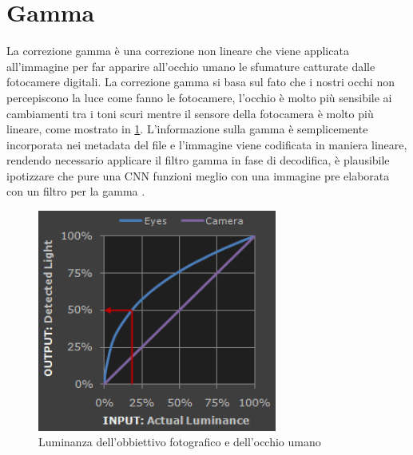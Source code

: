 \section{Gamma}\label{gamma}

La correzione gamma è una correzione non lineare che viene applicata all'immagine per far apparire all'occhio umano le sfumature catturate dalle fotocamere digitali. La correzione gamma si basa sul fato che i nostri occhi non percepiscono la luce come fanno le fotocamere, l'occhio è molto più sensibile ai cambiamenti tra i toni scuri mentre il sensore della fotocamera è molto più lineare, come mostrato in \cref{fig:gamma}. L'informazione sulla gamma è semplicemente incorporata nei metadata del file e l'immagine viene codificata in maniera lineare, rendendo necessario applicare il filtro gamma in fase di decodifica, è plausibile ipotizzare che pure una CNN funzioni meglio con una immagine pre elaborata con un filtro per la gamma \cite{gamma}.

\begin{figure}[ht]
    \centering
    \includegraphics[width=0.7\textwidth]{preprocessing/gamma.png}
    \caption{Luminanza dell'obbiettivo fotografico e dell'occhio umano}
    \label{fig:gamma}
\end{figure}



